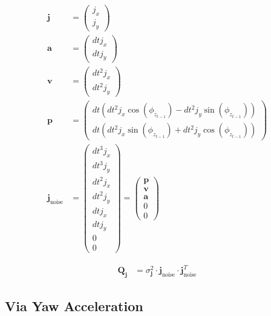 \documentclass{article}
\begin{document}
\begin{align}
  \textbf{j} &= \left(\begin{matrix}j_{x}\\j_{y}\end{matrix}\right) \\
  \textbf{a} &= \left(\begin{matrix}dt j_{x}\\dt j_{y}\end{matrix}\right) \\
  \textbf{v} &= \left(\begin{matrix}dt^{2} j_{x}\\dt^{2} j_{y}\end{matrix}\right) \\
  \textbf{p} &= \left(\begin{matrix}dt \left(dt^{2} j_{x} \cos{\left(\phi_{z_{t-1}} \right)} - dt^{2} j_{y} \sin{\left(\phi_{z_{t-1}} \right)}\right)\\dt \left(dt^{2} j_{x} \sin{\left(\phi_{z_{t-1}} \right)} + dt^{2} j_{y} \cos{\left(\phi_{z_{t-1}} \right)}\right)\end{matrix}\right) \\
  \textbf{j}_{\textrm{noise}} &= \left(\begin{matrix}dt^{3} j_{x}\\dt^{3} j_{y}\\dt^{2} j_{x}\\dt^{2} j_{y}\\dt j_{x}\\dt j_{y}\\0\\0\end{matrix}\right)
  = \left(\begin{matrix}
    \textbf{p} \\
    \textbf{v} \\
    \textbf{a} \\
    0 \\
    0
  \end{matrix}\right)
\end{align}

\begin{align}
  \textbf{Q}_{\textbf{j}} &= \sigma^2_{\textbf{j}} \cdot \textbf{j}_{\textrm{noise}} \cdot \textbf{j}_{\textrm{noise}}^T
\end{align}


\subsection{Via Yaw Acceleration}
\end{document}
